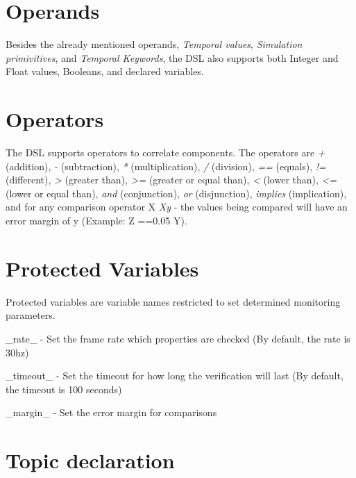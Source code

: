 \section{Operands}

Besides the already mentioned operands, \textit{Temporal values}, \textit{Simulation primivitives}, and \textit{Temporal Keywords}, the DSL also supports both Integer and Float values, Booleans, and declared variables.

\section{Operators}

The DSL supports operators to correlate components. The operators are \textit{+} (addition), \textit{-} (subtraction), \textit{*} (multiplication), \textit{/} (division), \textit{==} (equals), \textit{!=} (different), \textit{>} (greater than), \textit{>=} (greater or equal than), \textit{<} (lower than), \textit{<=} (lower or equal than), \textit{and} (conjunction), \textit{or} (disjunction), \textit{implies} (implication), and for any comparison operator X \textit{X{y}} - the values being compared will have an error margin of y (Example: Z =={0.05} Y).

\section{Protected Variables}

Protected variables are variable names restricted to set determined monitoring parameters.

\_rate\_ - Set the frame rate which properties are checked (By default, the rate is 30hz)

\_timeout\_ - Set the timeout for how long the verification will last (By default, the timeout is 100 seconds)

\_margin\_ - Set the error margin for comparisons

\section{Topic declaration}

